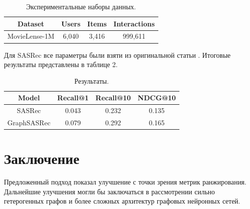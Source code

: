 \documentclass{article}
\begin{document}
\begin{table}[h]
    \centering
    \begin{tabular}{c|c|c|c}
        Dataset & Users & Items & Interactions\\
        \hline
        MovieLense-1M & 6,040 & 3,416 & 999,611 \\
    \end{tabular}
    \caption{Экспериментальные наборы данных.}
    \label{tab:my_label}
\end{table}

Для SASRec все параметры были взяти из оригинальной статьи \cite{sasrec}. Итоговые результаты представлены в таблице 2.

\begin{table}[h]
    \centering
    \begin{tabular}{c|c|c|c}
        Model & Recall@1 & Recall@10 & NDCG@10 \\
        \hline
        SASRec & 0.043 & 0.232 & 0.135 \\
		GraphSASRec & 0.079 & 0.292 & 0.165 \\
    \end{tabular}
    \caption{Результаты.}
    \label{tab:my_label}
\end{table}

\section{Заключение}

Предложенный подход показал улучшение с точки зрения метрик ранжирования. Дальнейшие улучшения могли бы 
заключаться в рассмотрении сильно гетерогенных графов и более сложных архитектур графовых нейронных сетей.


 
\end{document}
